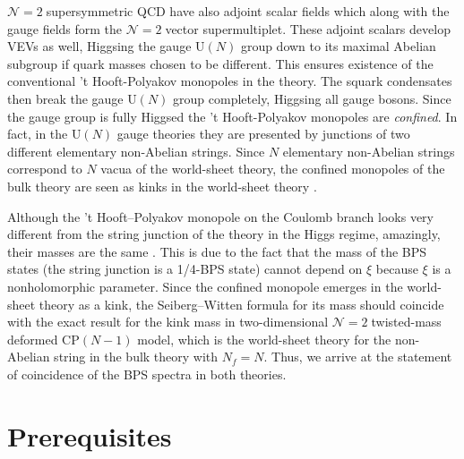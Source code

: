 \documentclass[epsfig,12pt]{article}
\newcommand{\ntwo}{${\mathcal N}=2\;$}
\begin{document}
\ntwo supersymmetric
 QCD have also adjoint scalar fields which along with the gauge fields form the \ntwo vector supermultiplet. These  adjoint scalars develop  VEVs as well, Higgsing
 the gauge U$(N)$ group
 down to its maximal Abelian subgroup if quark masses chosen to be different.
 This ensures existence of the conventional  't Hooft-Polyakov monopoles in the theory.
 The squark condensates then break the gauge U$(N)$ group completely, Higgsing all gauge bosons.
Since  the gauge group is fully Higgsed
the 't Hooft-Polyakov monopoles
are {\em confined}.  In fact, in
the   U$(N)$
gauge theories they are presented by junctions of two  different elementary non-Abelian strings.
Since $N$ elementary non-Abelian strings correspond to $N$ vacua of the world-sheet theory,
the   confined
monopoles of the bulk theory are seen as kinks in the world-sheet 
theory \cite{Tong,Shifman:2004dr,4}.


Although the 't Hooft--Polyakov monopole on the Coulomb branch
looks very different from the string junction of the theory in the Higgs regime,
amazingly, their masses are the same 
\cite{Shifman:2004dr,4}. This is due to the fact that
the mass of the BPS states (the string junction is a 1/4-BPS state) cannot depend on
$\xi$ because $\xi$ is a nonholomorphic parameter. Since the confined monopole
emerges in the world-sheet theory as a kink, the Seiberg--Witten
formula for its mass should coincide with the exact result for the kink
mass in two-dimensional \ntwo twisted-mass deformed  CP$(N-1)$ model, which is 
the world-sheet theory for the non-Abelian string in the bulk theory with $N_f=N$. 
 Thus, we arrive at
the statement of coincidence of the BPS spectra in both theories.







\section{Prerequisites}
\setcounter{equation}{0}
\label{prer}
\end{document}
